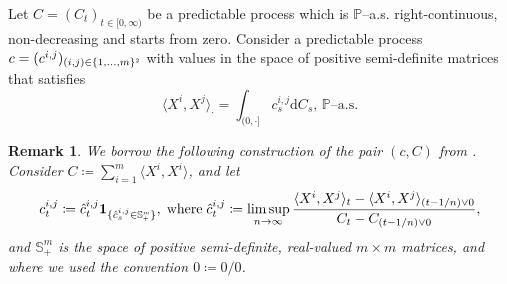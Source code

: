 \documentclass[10pt]{article} %
\newtheorem{remark}[theorem]{Remark}
\newcommand{\smalltext}[1]{\text{\fontsize{4}{4}\selectfont$#1$}}
\def \P{\mathbb{P}}
\def \S{\mathbb{S}}
\newcommand{\1}{\mathbf{1}}
\def\d{\mathrm{d}}
\begin{document}
\medskip
Let $C = (C_t)_{t \in [0,\infty)}$ be a predictable process which is $\P$--a.s. right-continuous, non-decreasing and starts from zero. Consider a predictable process $c = (c^{i,j})_{(i,j) \in \{1,\ldots,m\}^\smalltext{2}}$ with values in the space of positive semi-definite matrices that satisfies
\begin{equation}\label{eq::dis_x_circ}
	\langle X^i, X^j \rangle_\cdot = \int_{(0,\cdot]} c^{i,j}_s \d C_s, \, \text{$\P$--a.s.}
\end{equation}

\begin{remark}
	We borrow the following construction of the pair $(c,C)$ from {\rm\cite{nutz2015robust}}. Consider $C \coloneqq \sum_{i = 1}^m \langle X^i, X^i \rangle$, and let
	\begin{equation*}
		c^{i,j}_t \coloneqq \hat c^{i,j}_t \mathbf{1}_{\{\hat c^{i,j}_s \in \S^\smalltext{m}_\smalltext{+}\}}, \; \text{\rm where} \; \hat c^{i,j}_t \coloneqq \limsup_{n \rightarrow \infty} \frac{\langle X^i,X^j \rangle_t - \langle X^i,X^j\rangle_{(t-1/n)\lor 0}}{C_t - C_{(t-1/n) \lor 0}},
	\end{equation*}
	and $\S^m_+$ is the space of positive semi-definite, real-valued $m \times m$ matrices, and where we used the convention $0 \coloneqq 0 / 0$.
\end{remark}
\end{document}
